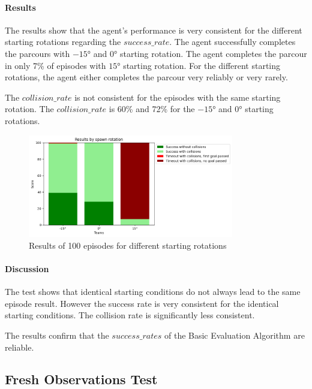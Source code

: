 \paragraph{Results}

The results show that the agent's performance is very consistent for the different starting rotations regarding the $success\_rate$. The agent successfully completes the parcours with $-15°$ and $0°$ starting rotation. The agent completes the parcour in only 7\% of episodes with $15°$ starting rotation.
For the different starting rotations, the agent either completes the parcour very reliably or very rarely.

The $collision\_rate$ is not consistent for the episodes with the same starting rotation. The $collision\_rate$ is 60\% and 72\% for the $-15°$ and $0°$ starting rotations. 

\begin{figure}
    \centering
    \includegraphics[width=0.8\textwidth]{Bilder/notebook_images/identicalResults_mixedLightSettings.png}
    \caption{Results of 100 episodes for different starting rotations}
    \label{fig:identical_start_conditions_test_result}
\end{figure}


\paragraph{Discussion}

The test shows that identical starting conditions do not always lead to the same episode result. However the success rate is very consistent for the identical starting conditions. The collision rate is significantly less consistent.

The results confirm that the $success\_rates$ of the Basic Evaluation Algorithm are reliable. 


\subsection{Fresh Observations Test}

